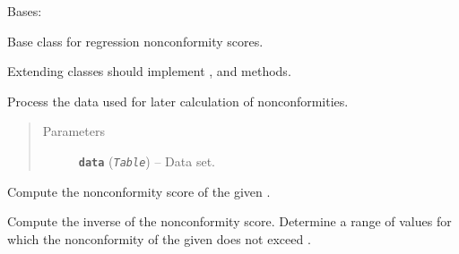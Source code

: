 \documentclass[letterpaper,10pt,english]{sphinxmanual}
\begin{document}
\begin{fulllineitems}
\label{cp.nonconformity:cp.nonconformity.RegrNC}
Bases: 

Base class for regression nonconformity scores.

Extending classes should implement {\hyperref[cp.nonconformity:cp.nonconformity.RegrNC.fit]{}}, {\hyperref[cp.nonconformity:cp.nonconformity.RegrNC.nonconformity]{}} and {\hyperref[cp.nonconformity:cp.nonconformity.RegrNC.predict]{}} methods.

\begin{fulllineitems}
\label{cp.nonconformity:cp.nonconformity.RegrNC.fit}
Process the data used for later calculation of nonconformities.
\begin{quote}\begin{description}
\item[{Parameters}] \leavevmode
\textbf{\texttt{data}} (\emph{\texttt{Table}}) -- Data set.

\end{description}\end{quote}

\end{fulllineitems}


\begin{fulllineitems}
\label{cp.nonconformity:cp.nonconformity.RegrNC.nonconformity}
Compute the nonconformity score of the given .

\end{fulllineitems}


\begin{fulllineitems}
\label{cp.nonconformity:cp.nonconformity.RegrNC.predict}
Compute the inverse of the nonconformity score. Determine a range of values for which the
nonconformity of the given  does not exceed .

\end{fulllineitems}


\end{fulllineitems}
\end{document}
